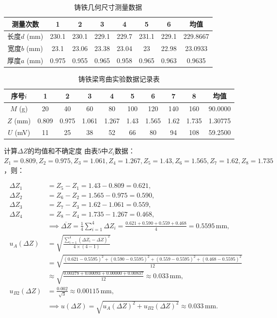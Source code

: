 \documentclass[11pt]{article}
\begin{document}
\begin{enumerate}
\begin{table}[htbp]
  \centering
  \caption{铸铁几何尺寸测量数据}
  \vspace{0.5em}
  \begin{tabular}{c c c c c c c c}
    \toprule
    测量次数 & 1 & 2 & 3 & 4 & 5 & 6 & 均值 \\
    \midrule
    长度$d$ (mm) & 230.1 & 230.1 & 229.1 & 229.7 & 231.1 & 229.1 & 229.8667 \\
    宽度$b$ (mm) & 23.1 & 23.06 & 23.38 & 23.04 & 23 & 22.98 & 23.0933 \\
    厚度$a$ (mm) & 0.975 & 0.955 & 0.965 & 0.958 & 0.965 & 0.963 & 0.9635 \\
    \bottomrule
  \end{tabular}
  \label{tab:geo_measurement}
\end{table}

\begin{table}[htbp]
  \centering
  \caption{铸铁梁弯曲实验数据记录表}
  \vspace{0.5em}
  \begin{tabular}{c c c c c c c c c c}
    \toprule
    序号$i$ & 1 & 2 & 3 & 4 & 5 & 6 & 7 & 8 & 均值 \\
    \midrule
    $M$ (g) & 20 & 40 & 60 & 80 & 100 & 120 & 140 & 160 & 90.0000 \\
    $Z$ (mm) & 0.809 & 0.975 & 1.061 & 1.267 & 1.43 & 1.565 & 1.62 & 1.735 & 1.30775 \\
    $U$ (mV) & 11 & 25 & 38 & 52 & 66 & 80 & 94 & 108 & 59.2500 \\
    \bottomrule
  \end{tabular}
  \label{tab:data}
\end{table}

    计算\(\Delta Z\)的均值和不确定度
    由表5中\( Z_i \)数据：\( Z_1=0.809, Z_2=0.975, Z_3=1.061, Z_4=1.267, Z_5=1.43, Z_6=1.565, Z_7=1.62, Z_8=1.735 \)，则：

    \begin{align*}
    \Delta Z_1 &= Z_5 - Z_1 = 1.43 - 0.809 = 0.621, \\
    \Delta Z_2 &= Z_6 - Z_2 = 1.565 - 0.975 = 0.590, \\
    \Delta Z_3 &= Z_7 - Z_3 = 1.62 - 1.061 = 0.559, \\
    \Delta Z_4 &= Z_8 - Z_4 = 1.735 - 1.267 = 0.468, \\
    &\implies \overline{\Delta Z} = \frac{1}{4}\sum_{i=1}^4 \Delta Z_i = \frac{0.621 + 0.590 + 0.559 + 0.468}{4} = 0.5595 \, \text{mm}, \\
    u_A(\Delta Z) &= \sqrt{\frac{\sum_{i=1}^4 (\Delta Z_i - \overline{\Delta Z})^2}{4 \times (4-1)}} \\
    &= \sqrt{\frac{(0.621-0.5595)^2 + (0.590-0.5595)^2 + (0.559-0.5595)^2 + (0.468-0.5595)^2}{12}} \\
    &\approx \sqrt{\frac{0.00378 + 0.00093 + 0.00000 + 0.00837}{12}} \approx 0.033 \, \text{mm}, \\
    u_{B2}(\Delta Z) &= \frac{0.002}{\sqrt{3}} \approx 0.00115 \, \text{mm}, \\
    &\implies u(\Delta Z) = \sqrt{u_A(\Delta Z)^2 + u_{B2}(\Delta Z)^2} \approx 0.033 \, \text{mm}.
    \end{align*}



\end{enumerate}
\end{document}
